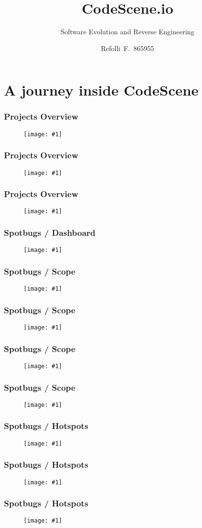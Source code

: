 \documentclass{beamer}
\title{CodeScene.io}
\subtitle{Software Evolution and Reverse Engineering}
\author{Refolli~F.~865955}
\newcommand{\putimage}[2] {
\begin{figure}[H]
  \centering
  \texttt{[image: \#1]}
\end{figure}
}
\begin{document}
\frame{\titlepage}

\section{A journey inside CodeScene}

\begin{frame}
  \frametitle{Projects Overview}
  \putimage{img/projects-1.png}{0.99}
\end{frame}

\begin{frame}
  \frametitle{Projects Overview}
  \putimage{img/projects-2.png}{0.99}
\end{frame}

\begin{frame}
  \frametitle{Projects Overview}
  \putimage{img/projects-3.png}{0.99}
\end{frame}

\begin{frame}
  \frametitle{Spotbugs / Dashboard}
  \putimage{img/spotbugs-dashboard-1.png}{0.99}
\end{frame}

\begin{frame}
  \frametitle{Spotbugs / Scope}
  \putimage{img/spotbugs-scope-1.png}{0.99}
\end{frame}

\begin{frame}
  \frametitle{Spotbugs / Scope}
  \putimage{img/spotbugs-scope-2.png}{0.99}
\end{frame}

\begin{frame}
  \frametitle{Spotbugs / Scope}
  \putimage{img/spotbugs-scope-3.png}{0.99}
\end{frame}

\begin{frame}
  \frametitle{Spotbugs / Scope}
  \putimage{img/spotbugs-scope-4.png}{0.99}
\end{frame}

\begin{frame}
  \frametitle{Spotbugs / Hotspots}
  \putimage{img/spotbugs-hotspots-1.png}{0.99}
\end{frame}

\begin{frame}
  \frametitle{Spotbugs / Hotspots}
  \putimage{img/spotbugs-hotspots-2.png}{0.99}
\end{frame}

\begin{frame}
  \frametitle{Spotbugs / Hotspots}
  \putimage{img/spotbugs-hotspots-3.png}{0.99}
\end{frame}
\end{document}
